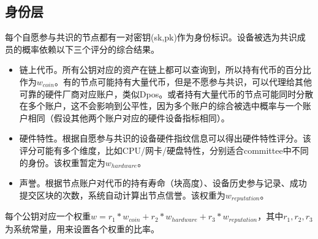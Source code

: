 \documentclass[12pt, UTF8]{article}
\begin{document}
\subsection{身份层}
每个自愿参与共识的节点都有一对密钥(sk,pk)作为身份标识。设备被选为共识成员的概率依赖以下三个评分的综合结果。
\begin{itemize}
\item 链上代币。所有公钥对应的资产在链上都可以查询到，所以持有代币的百分比作为$w_{coin}$。有的节点可能持有大量代币，但是不愿参与共识，可以代理给其他可靠的硬件厂商对应账户，类似Dpos。或者持有大量代币的节点可能同时分散在多个账户，这不会影响到公平性，因为多个账户的综合被选中概率与一个账户相同（假设其他两个账户对应的硬件设备指标相同）。

\item 硬件特性。根据自愿参与共识的设备硬件指纹信息可以得出硬件特性评分。该评分可能有多个维度，比如CPU/网卡/硬盘特性，分别适合committee中不同的身份。该权重暂定为$w_{hardware}$。
\item 声誉。根据节点账户对代币的持有寿命（块高度）、设备历史参与记录、成功提交区块的次数，系统自动计算出节点信誉。该权重为$w_{reputation}$。
\end{itemize}
每个公钥对应一个权重$w=r_1*w_{coin}+r_2*w_{hardware}+r_3*w_{reputation}$，其中$r_1,r_2,r_3$为系统常量，用来设置各个权重的比率。

\begin{comment}
区分于RANDAO或者Dfinity的方式，在于如下两点：
\begin{itemize}
\item 该方式，只要有足够多的节点联合起来，或者一个控制了大量代币的用户，只要超过了阈值，那么就可以预测下一轮的随机数，这样可以有时间窗口去DDOS攻击下一轮的提议者，以此影响系统的公正性。
\item 该方式延时比较高，对于其中一个节点，需要足够多节点响应，才能确定随机数结果。
\item 该方式比较高效的非交互式算法，只有基于椭圆曲线pairing的BLS算法，该算法相对一般椭圆曲线运算如点乘，性能比较低。其他如RSA算法需要节点交互。
\end{itemize}
\end{comment}

\begin{comment}
本层需要初始化的种子seed，可以放在创世区块中。该种子没有特殊要求，可以是任意256bit字符串。VRF层每次都会根据上一轮的种子，生成下一轮的种子，并包含在下一轮的区块中。
假设上一轮block中的种子为seedr，每个可能选为committee的节点$(pk, sk)$，独立运行伪随机函数f，输出256bit，该输出归一化到[0,1)，小于节点自身权重w，则为被选中，可以广播消息。即
\begin{equation}
Th_{min}<f(sk,seed_r)/2^{256} <w
\end{equation}

这里thmin为系统参数，可以动态调整，为了提高效率，过滤掉小概率的用户。目的是为了结合w的分布，共同设置一个窗口，保证足够多的节点被选中。
\end{comment}
\end{document}
